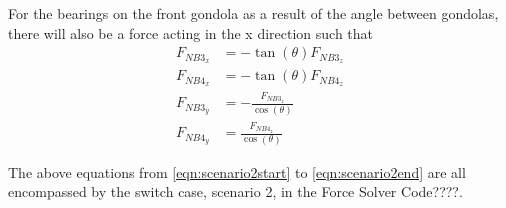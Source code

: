 \documentclass[../main.tex]{subfiles}
\begin{document}
For the bearings on the front gondola as a result of the  angle between gondolas, there will also be a force acting in the x direction such that 
\begin{align}
F_{NB3_{x}} &= -\tan(\theta) F_{NB3_{z}}\\ 
F_{NB4_{x}} &= -\tan(\theta) F_{NB4_{z}}\\
F_{NB3_{y}} &= -\frac{F_{NB3_{z}}}{\cos(\theta)} \\ F_{NB4_{y}} &= \frac{F_{NB4_{z}}}{\cos(\theta)} \label{eqn:scenario2end}
\end{align}

The above equations from \ref{eqn:scenario2start} to \ref{eqn:scenario2end} are all encompassed by the switch case, scenario 2, in the Force Solver Code????. 
\end{document}
